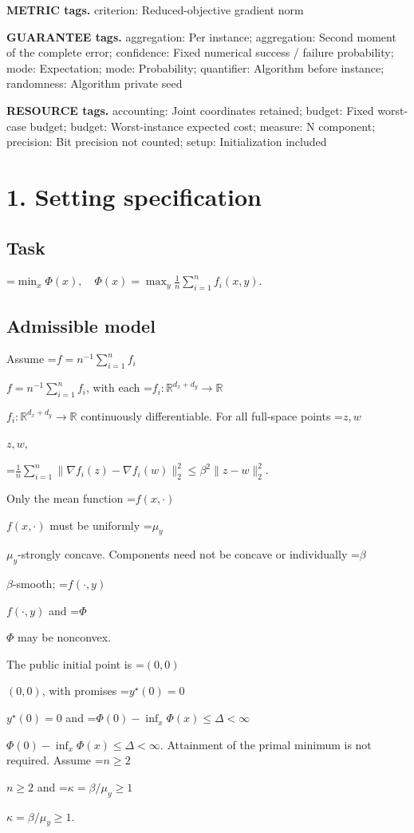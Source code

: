\documentclass[10pt,a4paper]{article}
\newcommand{\AtlasMath}[1]{\par\begingroup\centering\setbox0=\hbox{$\displaystyle #1$}\ifdim\wd0>1.4\linewidth\typeout{ATLAS WIDE FORMULA: \the\wd0}\fi\ifdim\wd0>\linewidth\resizebox{\linewidth}{!}{\box0}\else\box0\fi\par\endgroup}
\newcommand{\AtlasInlineMath}[1]{\begingroup\setbox0=\hbox{$#1$}\ifdim\wd0>.4\linewidth\endgroup\AtlasMath{#1}\else\endgroup$#1$\fi}
\begin{document}
\textbf{METRIC tags.} criterion: Reduced-objective gradient norm



\textbf{GUARANTEE tags.} aggregation: Per instance; aggregation: Second moment of the complete error; confidence: Fixed numerical success / failure probability; mode: Expectation; mode: Probability; quantifier: Algorithm before instance; randomness: Algorithm private seed



\textbf{RESOURCE tags.} accounting: Joint coordinates retained; budget: Fixed worst-case budget; budget: Worst-instance expected cost; measure: N component; precision: Bit precision not counted; setup: Initialization included



\section{1. Setting specification}


\subsection{Task}



\AtlasMath{\min_x\Phi(x),\quad\Phi(x)=\max_y\frac1n\sum_{i=1}^n f_i(x,y).}




\subsection{Admissible model}


Assume \AtlasInlineMath{f=n^{-1}\sum_{i=1}^n f_i}, with each \AtlasInlineMath{f_i:\mathbb{R}^{d_x+d_y}\to\mathbb{R}} continuously differentiable. For all full-space points \AtlasInlineMath{z,w},




\AtlasMath{\frac1n\sum_{i=1}^n\|\nabla f_i(z)-\nabla f_i(w)\|_2^2\le\beta^2\|z-w\|_2^2.}




Only the mean function \AtlasInlineMath{f(x,\cdot)} must be uniformly \AtlasInlineMath{\mu_y}-strongly concave. Components need not be concave or individually \AtlasInlineMath{\beta}-smooth; \AtlasInlineMath{f(\cdot,y)} and \AtlasInlineMath{\Phi} may be nonconvex.



The public initial point is \AtlasInlineMath{(0,0)}, with promises \AtlasInlineMath{y^\star(0)=0} and \AtlasInlineMath{\Phi(0)-\inf_x\Phi(x)\le\Delta<\infty}. Attainment of the primal minimum is not required. Assume \AtlasInlineMath{n\ge2} and \AtlasInlineMath{\kappa=\beta/\mu_y\ge1}.
\end{document}
